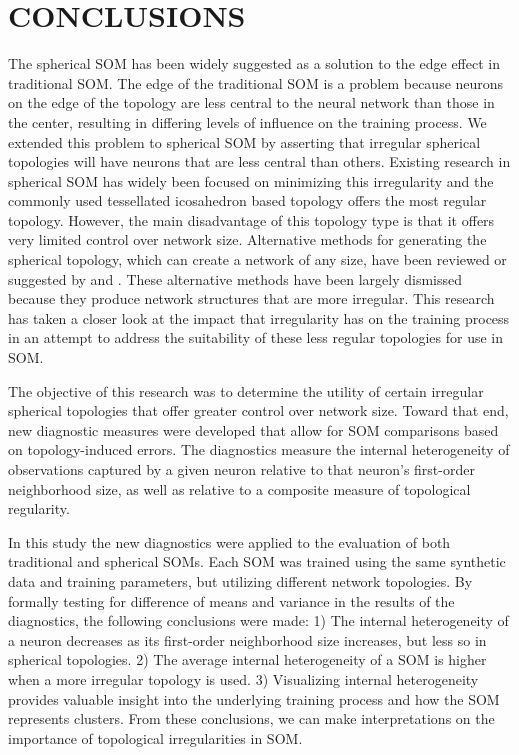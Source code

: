 \chapter{CONCLUSIONS}
The spherical SOM has been widely suggested as a solution to the edge effect
in traditional SOM.  The edge of the traditional SOM is a problem because neurons on
the edge of the topology are less central to the neural network than those in
the center, resulting in differing levels of influence on the
training process.  We extended this problem to spherical SOM by
asserting that irregular spherical topologies will have neurons that are less
central than others.  Existing research in spherical SOM has widely been
focused on minimizing this irregularity and the commonly used tessellated
icosahedron based topology offers the most regular topology. However, the main
disadvantage of this topology type is that it offers very limited control over
network size.  Alternative methods for generating the spherical topology,
which can create a network of any size, have been reviewed or suggested by
\cite{wu2005} and \cite{Nishio:2006fk}.  These alternative methods have been
largely dismissed because they produce network structures that are more irregular.
This research has taken a closer look at the impact that irregularity has on
the training process in an attempt to address the suitability of these less regular
topologies for use in SOM.

The objective of this research was to determine the utility of certain
irregular spherical topologies that offer greater control over
network size.  Toward that end, new diagnostic measures were developed that
allow for SOM comparisons based on topology-induced errors.  The diagnostics
measure the internal heterogeneity of observations captured by a given neuron
relative to that neuron's first-order neighborhood size, as well as relative
to a composite measure of topological regularity.

In this study the new diagnostics were applied to the evaluation of both
traditional and spherical SOMs. Each SOM was trained using the same synthetic
data and training parameters, but utilizing different network topologies.  By
formally testing for difference of means and variance in the results of the
diagnostics, the following conclusions were made: 1) The internal
heterogeneity of a neuron decreases as its first-order neighborhood size
increases, but less so in spherical topologies.  2) The average internal
heterogeneity of a SOM is higher when a more irregular topology is used.  3)
Visualizing internal heterogeneity provides valuable insight into the
underlying training process and how the SOM represents clusters. From these
conclusions, we can make interpretations on the importance of topological
irregularities in SOM.

